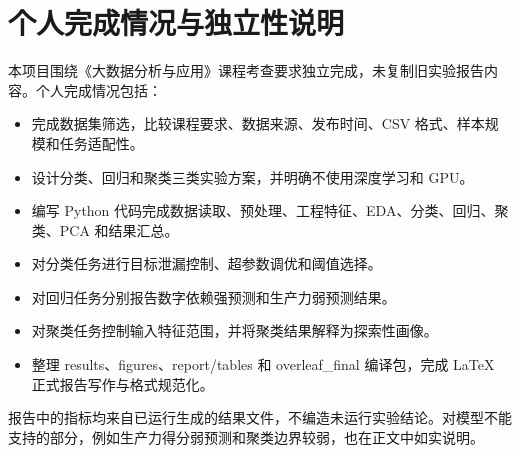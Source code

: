 \chapter{个人完成情况与独立性说明}

本项目围绕《大数据分析与应用》课程考查要求独立完成，未复制旧实验报告内容。个人完成情况包括：

\begin{itemize}
  \item 完成数据集筛选，比较课程要求、数据来源、发布时间、CSV 格式、样本规模和任务适配性。
  \item 设计分类、回归和聚类三类实验方案，并明确不使用深度学习和 GPU。
  \item 编写 Python 代码完成数据读取、预处理、工程特征、EDA、分类、回归、聚类、PCA 和结果汇总。
  \item 对分类任务进行目标泄漏控制、超参数调优和阈值选择。
  \item 对回归任务分别报告数字依赖强预测和生产力弱预测结果。
  \item 对聚类任务控制输入特征范围，并将聚类结果解释为探索性画像。
  \item 整理 results、figures、report/tables 和 overleaf\_final 编译包，完成 LaTeX 正式报告写作与格式规范化。
\end{itemize}

报告中的指标均来自已运行生成的结果文件，不编造未运行实验结论。对模型不能支持的部分，例如生产力得分弱预测和聚类边界较弱，也在正文中如实说明。
